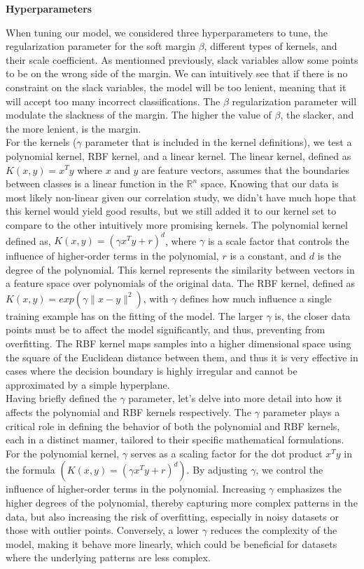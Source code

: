 \documentclass[twocolumn]{article}
\newcommand{\R}{\mathbb{R}}
\begin{document}
\textbf{\large Hyperparameters}

When tuning our model, we considered three hyperparameters to tune, the regularization parameter for the soft margin $\beta$, different types of kernels, and their scale coefficient. As mentionned previously, slack variables allow some points to be on the wrong side of the margin. We can intuitively see that if there is no constraint on the slack variables, the model will be too lenient, meaning that it will accept too many incorrect classifications. The $\beta$ regularization parameter will modulate the slackness of the margin. The higher the value of $\beta$, the slacker, and the more lenient, is the margin. \\
For the kernels ($\gamma$ parameter that is included in the kernel definitions), we test a polynomial kernel, RBF kernel, and a linear kernel. The linear kernel, defined as $K(x, y) = x^T y$ where $x$ and $y$ are feature vectors, assumes that the boundaries between classes is a linear function in the $\R^n$ space. Knowing that our data is most likely non-linear given our correlation study, we didn't have much hope that this kernel would yield good results, but we still added it to our kernel set to compare to the other intuitively more promising kernels. The polynomial kernel defined as, $K(x, y) = (\gamma x^T y + r )^d$, where $\gamma$ is a scale factor that controls the influence of higher-order terms in the polynomial, $r$ is a constant, and $d$ is the degree of the polynomial. This kernel represents the similarity between vectors in a feature space over polynomials of the original data. The RBF kernel, defined as $K(x, y) = exp(\gamma \| x - y \|^2)$, with $\gamma$ defines how much influence a single training example has on the fitting of the model. The larger $\gamma$ is, the closer data points must be to affect the model significantly, and thus, preventing from overfitting. The RBF kernel maps samples into a higher dimensional space using the square of the Euclidean distance between them, and thus it is very effective in cases where the decision boundary is highly irregular and cannot be approximated by a simple hyperplane. \\
Having briefly defined the $\gamma$ parameter, let's delve into more detail into how it affects the polynomial and RBF kernels respectively. The $\gamma$ parameter plays a critical role in defining the behavior of both the polynomial and RBF kernels, each in a distinct manner, tailored to their specific mathematical formulations.
For the polynomial kernel, $\gamma$ serves as a scaling factor for the dot product \(x^T y\) in the formula $(K(x, y) = (\gamma x^T y + r)^d)$. By adjusting $\gamma$, we control the influence of higher-order terms in the polynomial. Increasing $\gamma$ emphasizes the higher degrees of the polynomial, thereby capturing more complex patterns in the data, but also increasing the risk of overfitting, especially in noisy datasets or those with outlier points. Conversely, a lower $\gamma$ reduces the complexity of the model, making it behave more linearly, which could be beneficial for datasets where the underlying patterns are less complex.
\end{document}
